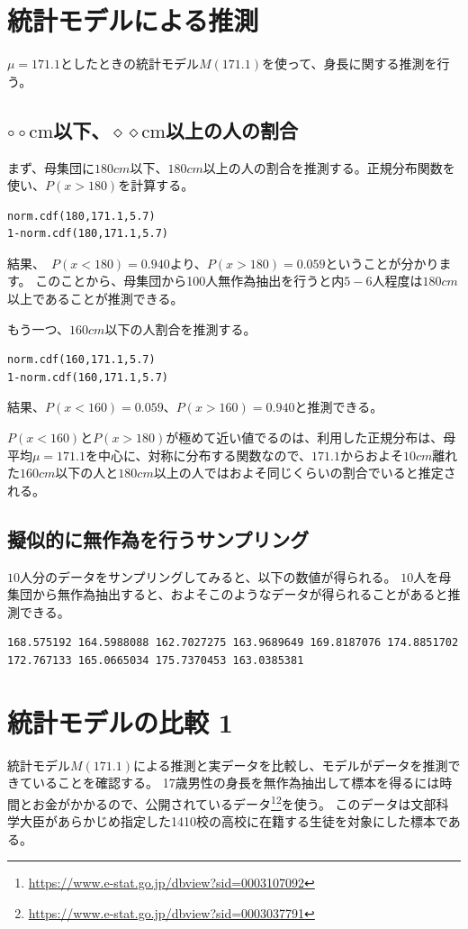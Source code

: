 \section{統計モデルによる推測}
$\mu=171.1$としたときの統計モデル$M(171.1)$を使って、身長に関する推測を行う。

\subsection{ $\circ\circ \mathrm{cm}$以下、$\diamond\diamond \mathrm{cm}$以上の人の割合}
まず、母集団に$180cm$以下、$180cm$以上の人の割合を推測する。正規分布関数を使い、$P(x>180)$を計算する。

\begin{lstlisting}
norm.cdf(180,171.1,5.7)
1-norm.cdf(180,171.1,5.7)
\end{lstlisting}
結果、　$P(x<180)=0.940$より、$P(x>180)=0.059$ということが分かります。
このことから、母集団から100人無作為抽出を行うと内$5-6$人程度は$180cm$以上であることが推測できる。

もう一つ、$160cm$以下の人割合を推測する。

\begin{lstlisting}
norm.cdf(160,171.1,5.7)
1-norm.cdf(160,171.1,5.7)
\end{lstlisting}
結果、$P(x<160)=0.059$、$P(x>160)=0.940$と推測できる。

$P(x<160)$と$P(x>180)$が極めて近い値でるのは、利用した正規分布は、母平均$\mu=171.1$を中心に、対称に分布する関数なので、$171.1$からおよそ$10cm$離れた$160cm$以下の人と$180cm$以上の人ではおよそ同じくらいの割合でいると推定される。
    
\subsection{擬似的に無作為を行うサンプリング}
$10$人分のデータをサンプリングしてみると、以下の数値が得られる。
$10$人を母集団から無作為抽出すると、およそこのようなデータが得られることがあると推測できる。

\begin{lstlisting}
168.575192 164.5988088 162.7027275 163.9689649 169.8187076 174.8851702 172.767133 165.0665034 175.7370453 163.0385381
\end{lstlisting}



\section{統計モデルの比較 1}
統計モデル$M(171.1)$による推測と実データを比較し、モデルがデータを推測できていることを確認する。
17歳男性の身長を無作為抽出して標本を得るには時間とお金がかかるので、公開されているデータ\footnote{ \url{https://www.e-stat.go.jp/dbview?sid=0003107092} }\footnote{\url{https://www.e-stat.go.jp/dbview?sid=0003037791}}を使う。
このデータは文部科学大臣があらかじめ指定した1410校の高校に在籍する生徒を対象にした標本である。


